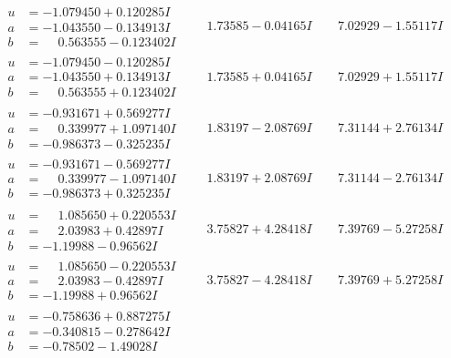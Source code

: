 \documentclass[1p]{elsarticle_modified}
\theoremstyle{definition}
\begin{document}
$$\begin{array}{c|c|c}
\begin{aligned}
u &= -1.079450 + 0.120285 I \\
a &= -1.043550 - 0.134913 I \\
b &= \phantom{-}0.563555 - 0.123402 I\end{aligned}
 & \phantom{-}1.73585 - 0.04165 I & \phantom{-}7.02929 - 1.55117 I \\ \hline\begin{aligned}
u &= -1.079450 - 0.120285 I \\
a &= -1.043550 + 0.134913 I \\
b &= \phantom{-}0.563555 + 0.123402 I\end{aligned}
 & \phantom{-}1.73585 + 0.04165 I & \phantom{-}7.02929 + 1.55117 I \\ \hline\begin{aligned}
u &= -0.931671 + 0.569277 I \\
a &= \phantom{-}0.339977 + 1.097140 I \\
b &= -0.986373 - 0.325235 I\end{aligned}
 & \phantom{-}1.83197 - 2.08769 I & \phantom{-}7.31144 + 2.76134 I \\ \hline\begin{aligned}
u &= -0.931671 - 0.569277 I \\
a &= \phantom{-}0.339977 - 1.097140 I \\
b &= -0.986373 + 0.325235 I\end{aligned}
 & \phantom{-}1.83197 + 2.08769 I & \phantom{-}7.31144 - 2.76134 I \\ \hline\begin{aligned}
u &= \phantom{-}1.085650 + 0.220553 I \\
a &= \phantom{-}2.03983 + 0.42897 I \\
b &= -1.19988 - 0.96562 I\end{aligned}
 & \phantom{-}3.75827 + 4.28418 I & \phantom{-}7.39769 - 5.27258 I \\ \hline\begin{aligned}
u &= \phantom{-}1.085650 - 0.220553 I \\
a &= \phantom{-}2.03983 - 0.42897 I \\
b &= -1.19988 + 0.96562 I\end{aligned}
 & \phantom{-}3.75827 - 4.28418 I & \phantom{-}7.39769 + 5.27258 I \\ \hline\begin{aligned}
u &= -0.758636 + 0.887275 I \\
a &= -0.340815 - 0.278642 I \\
b &= -0.78502 - 1.49028 I\end{aligned}

\end{array}$$
\end{document}
